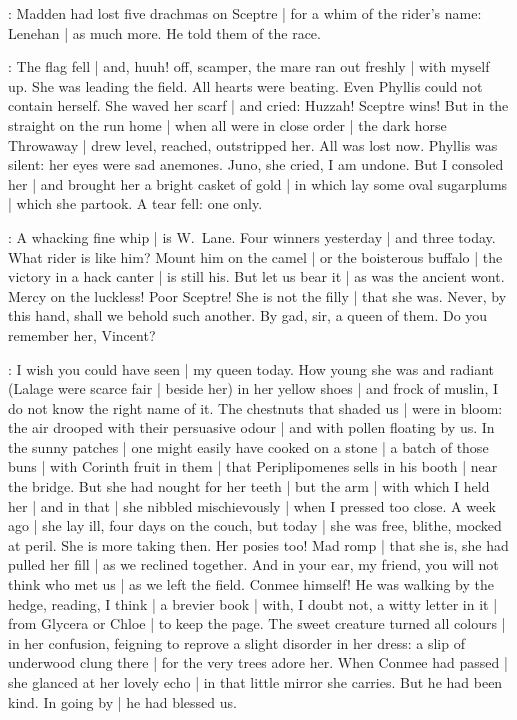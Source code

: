 :
Madden had lost five drachmas on Sceptre |
for a whim of the rider's name:
Lenehan |
as much more.
He told them of the race.

\madden:
The flag fell |
and,
huuh!
off,
scamper,
the mare ran out freshly |
with myself up.
She was leading the field.
All hearts were beating.%
Even Phyllis could not contain herself.
She waved her scarf |
and cried:
Huzzah!
Sceptre wins!
But in the straight on the run home |
when all were in close order |
the dark horse Throwaway |
drew level,
reached,
outstripped her.
All was lost now.
Phyllis was silent:
her eyes were sad anemones.
Juno,
she cried,
I am undone.
But I consoled her |
and brought her a bright casket of gold |
in which lay some oval sugarplums |
which she partook.
A tear fell:
one only.

\lenehan:
A whacking fine whip |
is W.~Lane.
Four winners yesterday |
and three today.
What rider is like him?
Mount him on the camel |
or the boisterous buffalo |
the victory in a hack canter |
is still his.
But let us bear it |
as was the ancient wont.
Mercy on the luckless!
Poor Sceptre!
She is not the filly |
that she was.
Never,
by this hand,
shall we behold such another.
By gad,
sir,
a queen of them.
Do you remember her,
Vincent?

\lynch:
I wish you could have seen |
my queen today.
How young she was and radiant
(Lalage were scarce fair |
beside her)
in her yellow shoes |
and frock of muslin,
I do not know the right name of it.
The chestnuts that shaded us |
were in bloom:
the air drooped with their persuasive odour |
and with pollen floating by us.
In the sunny patches |
one might easily have cooked on a stone |
a batch of those buns |
with Corinth fruit in them |
that Periplipomenes sells in his booth |
near the bridge.
But she had nought for her teeth |
but the arm |
with which I held her |
and in that |
she nibbled mischievously |
when I pressed too close.
A week ago |
she lay ill,
four days on the couch,
but today |
she was free,
blithe,
mocked at peril.
She is more taking then.
Her posies too!
Mad romp |
that she is,
she had pulled her fill |
as we reclined together.
And in your ear,
my friend,
you will not think who met us |
as we left the field.
Conmee himself!
He was walking by the hedge,
reading,
I think |
a brevier book |
with,
I doubt not,
a witty letter in it |
from Glycera or Chloe |
to keep the page.
The sweet creature turned all colours |
in her confusion,
feigning to reprove a slight disorder in her dress:
a slip of underwood clung there |
for the very trees adore her.
When Conmee had passed |
she glanced at her lovely echo |
in that little mirror she carries.
But he had been kind.
In going by |
he had blessed us.

